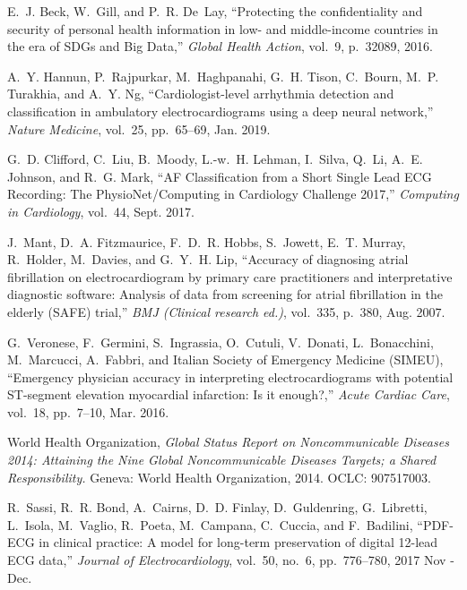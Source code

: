 \documentclass{article}
\begin{document}
\begin{thebibliography}{10}
E.~J. Beck, W.~Gill, and P.~R. De~Lay, ``Protecting the confidentiality and
  security of personal health information in low- and middle-income countries
  in the era of {{SDGs}} and {{Big Data}},'' {\em Global Health Action},
  vol.~9, p.~32089, 2016.

A.~Y. Hannun, P.~Rajpurkar, M.~Haghpanahi, G.~H. Tison, C.~Bourn, M.~P.
  Turakhia, and A.~Y. Ng, ``Cardiologist-level arrhythmia detection and
  classification in ambulatory electrocardiograms using a deep neural
  network,'' {\em Nature Medicine}, vol.~25, pp.~65--69, Jan. 2019.

G.~D. Clifford, C.~Liu, B.~Moody, L.-w.~H. Lehman, I.~Silva, Q.~Li, A.~E.
  Johnson, and R.~G. Mark, ``{{AF Classification}} from a {{Short Single Lead
  ECG Recording}}: The {{PhysioNet}}/{{Computing}} in {{Cardiology Challenge}}
  2017,'' {\em Computing in Cardiology}, vol.~44, Sept. 2017.

J.~Mant, D.~A. Fitzmaurice, F.~D.~R. Hobbs, S.~Jowett, E.~T. Murray, R.~Holder,
  M.~Davies, and G.~Y.~H. Lip, ``Accuracy of diagnosing atrial fibrillation on
  electrocardiogram by primary care practitioners and interpretative diagnostic
  software: Analysis of data from screening for atrial fibrillation in the
  elderly ({{SAFE}}) trial,'' {\em BMJ (Clinical research ed.)}, vol.~335,
  p.~380, Aug. 2007.

G.~Veronese, F.~Germini, S.~Ingrassia, O.~Cutuli, V.~Donati, L.~Bonacchini,
  M.~Marcucci, A.~Fabbri, and {Italian Society of Emergency Medicine (SIMEU)},
  ``Emergency physician accuracy in interpreting electrocardiograms with
  potential {{ST}}-segment elevation myocardial infarction: {{Is}} it
  enough?,'' {\em Acute Cardiac Care}, vol.~18, pp.~7--10, Mar. 2016.

{World Health Organization}, {\em Global Status Report on Noncommunicable
  Diseases 2014: Attaining the Nine Global Noncommunicable Diseases Targets; a
  Shared Responsibility.}
\newblock Geneva: {World Health Organization}, 2014.
\newblock OCLC: 907517003.

R.~Sassi, R.~R. Bond, A.~Cairns, D.~D. Finlay, D.~Guldenring, G.~Libretti,
  L.~Isola, M.~Vaglio, R.~Poeta, M.~Campana, C.~Cuccia, and F.~Badilini,
  ``{{PDF}}-{{ECG}} in clinical practice: {{A}} model for long-term
  preservation of digital 12-lead {{ECG}} data,'' {\em Journal of
  Electrocardiology}, vol.~50, no.~6, pp.~776--780, 2017 Nov - Dec.


\end{thebibliography}
\end{document}
